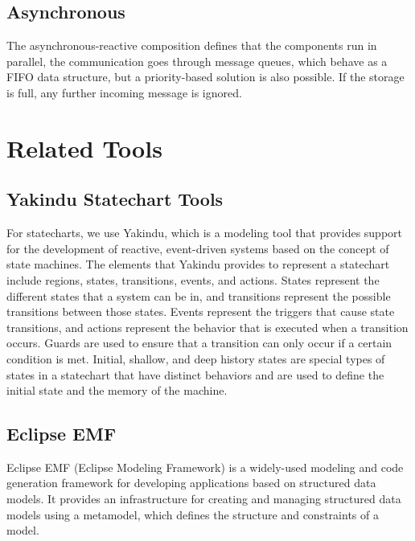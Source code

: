 \subsection{Asynchronous}

The asynchronous-reactive composition defines that the components run in parallel, the communication goes through message queues, which behave as a FIFO data structure, but a priority-based solution is also possible. If the storage is full, any further incoming message is ignored.

\newpage

\section{Related Tools}

\subsection{Yakindu Statechart Tools}

For statecharts, we use Yakindu\cite{Yakindu}, which is a modeling tool that provides support for the development of reactive, event-driven systems based on the concept of state machines. The elements that Yakindu provides to represent a statechart include regions, states, transitions, events, and actions. States represent the different states that a system can be in, and transitions represent the possible transitions between those states. Events represent the triggers that cause state transitions, and actions represent the behavior that is executed when a transition occurs. Guards are used to ensure that a transition can only occur if a certain condition is met. Initial, shallow, and deep history states are special types of states in a statechart that have distinct behaviors and are used to define the initial state and the memory of the machine.

\subsection{Eclipse EMF}

Eclipse EMF\cite{EMF} (Eclipse Modeling Framework) is a widely-used modeling and code generation framework for developing applications based on structured data models. It provides an infrastructure for creating and managing structured data models using a metamodel, which defines the structure and constraints of a model.

